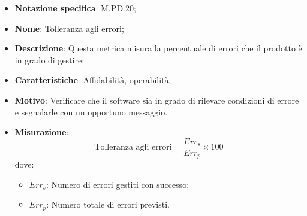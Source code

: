 \begin{itemize}
    \item \textbf{Notazione specifica}: M.PD.20;
    \item \textbf{Nome}: Tolleranza agli errori;
    \item \textbf{Descrizione}: Questa metrica misura la percentuale di errori che il prodotto è in grado di gestire;
    \item \textbf{Caratteristiche}: Affidabilità, operabilità;
    \item \textbf{Motivo}: Verificare che il software sia in grado di rilevare condizioni di errore e segnalarle con un opportuno messaggio.
    \item \textbf{Misurazione}:
    \[
        \text{Tolleranza agli errori} = \frac{Err_{s}}{Err_{p}} \times 100
    \]
    dove:
    \begin{itemize}
        \item $Err_{s}$: Numero di errori gestiti con successo;
        \item $Err_{p}$: Numero totale di errori previsti.
    \end{itemize}
\end{itemize}
